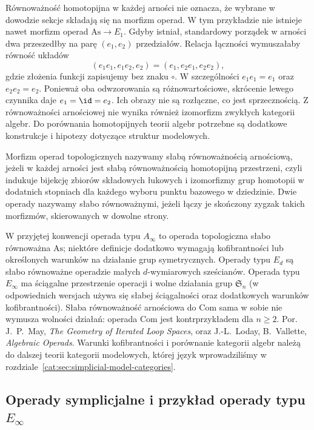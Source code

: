 Równoważność homotopijna w każdej arności nie oznacza, że wybrane w dowodzie sekcje składają się na morfizm operad. W tym przykładzie nie istnieje nawet morfizm operad $\mathrm{As}\to E_1$. Gdyby istniał, standardowy porządek w arności dwa przeszedłby na parę $(e_1,e_2)$ przedziałów. Relacja łączności wymuszałaby równość układów
\[
 (e_1e_1,e_1e_2,e_2)=(e_1,e_2e_1,e_2e_2),
\]
gdzie złożenia funkcji zapisujemy bez znaku $\circ$. W szczególności $e_1e_1=e_1$ oraz $e_2e_2=e_2$. Ponieważ oba odwzorowania są różnowartościowe, skrócenie lewego czynnika daje $e_1=\id=e_2$. Ich obrazy nie są rozłączne, co jest sprzecznością. Z równoważności arnościowej nie wynika również izomorfizm zwykłych kategorii algebr. Do porównania homotopijnych teorii algebr potrzebne są dodatkowe konstrukcje i hipotezy dotyczące struktur modelowych.

\begin{definicja}\label{cat:def:operad-weak-equivalence}
Morfizm operad topologicznych nazywamy słabą równoważnością arnościową, jeżeli w każdej arności jest słabą równoważnością homotopijną przestrzeni, czyli indukuje bijekcję zbiorów składowych łukowych i izomorfizmy grup homotopii w dodatnich stopniach dla każdego wyboru punktu bazowego w dziedzinie. Dwie operady nazywamy słabo równoważnymi, jeżeli łączy je skończony zygzak takich morfizmów, skierowanych w dowolne strony.
\end{definicja}
W przyjętej konwencji operada typu $A_\infty$ to operada topologiczna słabo równoważna $\mathrm{As}$; niektóre definicje dodatkowo wymagają kofibrantności lub określonych warunków na działanie grup symetrycznych. Operady typu $E_d$ są słabo równoważne operadzie małych $d$-wymiarowych sześcianów. Operada typu $E_\infty$ ma ściągalne przestrzenie operacji i wolne działania grup $\mathfrak S_n$ (w odpowiednich wersjach używa się słabej ściągalności oraz dodatkowych warunków kofibrantności). Słaba równoważność arnościowa do $\mathrm{Com}$ sama w sobie nie wymusza wolności działań: operada $\mathrm{Com}$ jest kontrprzykładem dla $n\geq2$. Por. J.~P.~May, \emph{The Geometry of Iterated Loop Spaces}, oraz J.-L.~Loday, B.~Vallette, \emph{Algebraic Operads}. Warunki kofibrantności i porównanie kategorii algebr należą do dalszej teorii kategorii modelowych, której język wprowadziliśmy w rozdziale~\ref{cat:sec:simplicial-model-categories}.

\subsection{Operady symplicjalne i przykład operady typu $E_\infty$}

